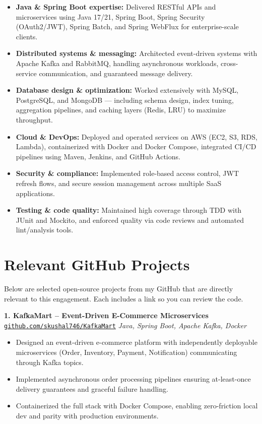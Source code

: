 \documentclass[11pt,letterpaper]{article}
\begin{document}
\begin{itemize}[leftmargin=0.3in, noitemsep, topsep=2pt, partopsep=0pt, parsep=1pt]
    \item \textbf{Java \& Spring Boot expertise:} Delivered RESTful APIs and microservices using Java 17/21, Spring Boot, Spring Security (OAuth2/JWT), Spring Batch, and Spring WebFlux for enterprise-scale clients.
    \item \textbf{Distributed systems \& messaging:} Architected event-driven systems with Apache Kafka and RabbitMQ, handling asynchronous workloads, cross-service communication, and guaranteed message delivery.
    \item \textbf{Database design \& optimization:} Worked extensively with MySQL, PostgreSQL, and MongoDB — including schema design, index tuning, aggregation pipelines, and caching layers (Redis, LRU) to maximize throughput.
    \item \textbf{Cloud \& DevOps:} Deployed and operated services on AWS (EC2, S3, RDS, Lambda), containerized with Docker and Docker Compose, integrated CI/CD pipelines using Maven, Jenkins, and GitHub Actions.
    \item \textbf{Security \& compliance:} Implemented role-based access control, JWT refresh flows, and secure session management across multiple SaaS applications.
    \item \textbf{Testing \& code quality:} Maintained high coverage through TDD with JUnit and Mockito, and enforced quality via code reviews and automated lint/analysis tools.
\end{itemize}

\section{Relevant GitHub Projects}

Below are selected open-source projects from my GitHub that are directly relevant to this engagement. Each includes a link so you can review the code.

\vspace{4pt}

\textbf{1. KafkaMart -- Event-Driven E-Commerce Microservices}\\
\href{https://github.com/skushal746/KafkaMart}{\texttt{github.com/skushal746/KafkaMart}} \hfill \textit{Java, Spring Boot, Apache Kafka, Docker}
\begin{itemize}[leftmargin=0.3in, noitemsep, topsep=2pt, partopsep=0pt, parsep=0pt]
    \item Designed an event-driven e-commerce platform with independently deployable microservices (Order, Inventory, Payment, Notification) communicating through Kafka topics.
    \item Implemented asynchronous order processing pipelines ensuring at-least-once delivery guarantees and graceful failure handling.
    \item Containerized the full stack with Docker Compose, enabling zero-friction local dev and parity with production environments.
\end{itemize}
\end{document}

